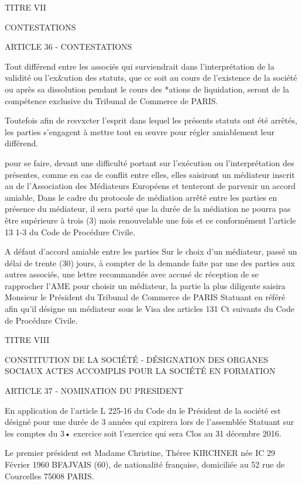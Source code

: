 \documentclass{article}
\begin{document}
TITRE VII

CONTESTATIONS

ARTICLE 36 - CONTESTATIONS

Tout différend entre les associés qui surviendrait dans l'interprétation de la validité ou l'ex&ution des statuts, que cc soit au cours de l'existence de la société ou après sa dissolution pendant le cours des *ations de liquidation, seront de la compétence exclusive du Tribunal de Commerce de PARIS.

Toutefois afin de rcsvxcter l'esprit dans lequel les présents statuts ont été arrêtés, les parties s'engagent à mettre tout en œuvre pour régler amiablement leur différend.

pour se faire, devant une difficulté portant sur l'exécution ou l'interprétation des présentes, comme en cas de conflit entre elles, elles saisiront un médiateur inscrit au de l'Association des Médiateurs Européens et tenteront de parvenir un accord amiable,
Dans le cadre du protocole de médiation arrêté entre les parties en présence du médiateur, il sera porté que la durée de la médiation ne pourra pas être supérieure à trois (3) mois renouvelable une fois et ce conformément l'article 13 1-3 du Code de Procédure Civile.

A défaut d'accord amiable entre les parties Sur le choix d'un médiateur, passé un délai de trente (30) jours, à compter de la demande faite par une des parties aux autres associés, une lettre recommandée avec accusé dc réception de se rapprocher l'AME pour choisir un médiateur, la partie la plus diligente saisira Monsieur le Président du Tribunal de Commerce de PARIS Statuant en référé afin qu'il désigne un médiateur sous le Visa des articles 131 Ct suivants du Code de Procédure Civile.

TITRE VIII

CONSTITUTION DE LA SOCIÉTÉ - DÉSIGNATION DES ORGANES SOCIAUX ACTES ACCOMPLIS POUR LA SOCIÉTÉ EN FORMATION

ARTICLE 37 - NOMINATION DU PRESIDENT

En application de l'article L 225-16 du Code du le Président de la société est désigné pour une durée de 3 années qui expirera lors de l'assemblée Statuant sur les comptes du 3• exercice soit l'exercice qui sera Clos au 31 décembre 2016.

Le premier président est Madame Christine, Théree KIRCHNER née IC 29 Février 1960 BFAJVAIS (60), de nationalité française, domiciliée au 52 rue de Courcelles 75008 PARIS.
\end{document}
